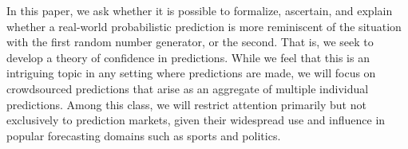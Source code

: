 \documentclass[sigconf,anonymous]{aamas}   %
\newcommand{\rupert}[1]{\ifnum\Chatty=1 \textcolor{red}   {Rupert: [#1]} \fi}
\begin{document}
In this paper, we ask whether it is possible to formalize, ascertain, and explain whether a real-world probabilistic prediction is more reminiscent of the situation with the first random number generator, or the second. That is, we seek to develop a theory of confidence in predictions. While we feel that this is an intriguing topic in any setting where predictions are made, we will focus on crowdsourced predictions that arise as an aggregate of multiple individual predictions. Among this class, we will restrict attention primarily but not exclusively to prediction markets, given their widespread use and influence in popular forecasting domains such as sports and politics.


\end{document}
